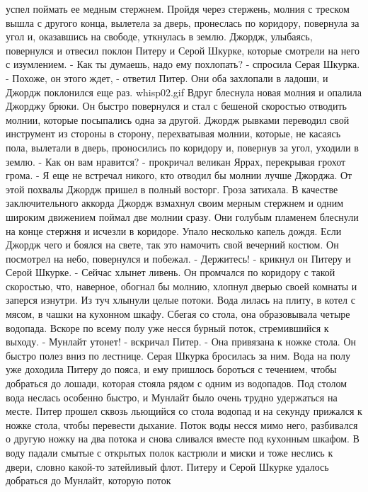 успел поймать ее медным стержнем. Пройдя через стержень, молния с 
треском вышла с другого конца, вылетела за дверь, пронеслась по 
коридору, повернула за угол и, оказавшись на свободе, уткнулась в 
землю.
    Джордж, улыбаясь, повернулся и отвесил поклон Питеру и Серой 
Шкурке, которые смотрели на него с изумлением.
    - Как ты думаешь, надо ему похлопать? - спросила Серая Шкурка.
    - Похоже, он этого ждет, - ответил Питер.
    Они оба захлопали в ладоши, и Джордж поклонился еще раз.
    {whisp02.gif}
    Вдруг блеснула новая молния и опалила Джорджу брюки. Он быстро 
повернулся и стал с бешеной скоростью отводить молнии, которые 
посыпались одна за другой. Джордж рывками переводил свой инструмент из 
стороны в сторону, перехватывая молнии, которые, не касаясь пола, 
вылетали в дверь, проносились по коридору и, повернув за угол, уходили 
в землю.
    - Как он вам нравится? - прокричал великан Яррах, перекрывая 
грохот грома. - Я еще не встречал никого, кто отводил бы молнии лучше 
Джорджа.
    От этой похвалы Джордж пришел в полный восторг. Гроза затихала. В 
качестве заключительного аккорда Джордж взмахнул своим мерным стержнем 
и одним широким движением поймал две молнии сразу. Они голубым 
пламенем блеснули на конце стержня и исчезли в коридоре.
    Упало несколько капель дождя. Если Джордж чего и боялся на свете, 
так это намочить свой вечерний костюм. Он посмотрел на небо, 
повернулся и побежал.
    - Держитесь! - крикнул он Питеру и Серой Шкурке. - Сейчас хлынет 
ливень.
    Он промчался по коридору с такой скоростью, что, наверное, обогнал 
бы молнию, хлопнул дверью своей комнаты и заперся изнутри.
    Из туч хлынули целые потоки. Вода лилась на плиту, в котел с 
мясом, в чашки на кухонном шкафу. Сбегая со стола, она образовывала 
четыре водопада. Вскоре по всему полу уже несся бурный поток, 
стремившийся к выходу.
    - Мунлайт утонет! - вскричал Питер. - Она привязана к ножке стола.
    Он быстро полез вниз по лестнице. Серая Шкурка бросилась за ним. 
Вода на полу уже доходила Питеру до пояса, и ему пришлось бороться с 
течением, чтобы добраться до лошади, которая стояла рядом с одним из 
водопадов. Под столом вода неслась особенно быстро, и Мунлайт было 
очень трудно удержаться на месте.
    Питер прошел сквозь льющийся со стола водопад и на секунду 
прижался к ножке стола, чтобы перевести дыхание. Поток воды несся мимо 
него, разбивался о другую ножку на два потока и снова сливался вместе 
под кухонным шкафом. В воду падали смытые с открытых полок кастрюли и 
миски и тоже неслись к двери, словно какой-то затейливый флот.
    Питеру и Серой Шкурке удалось добраться до Мунлайт, которую поток 

